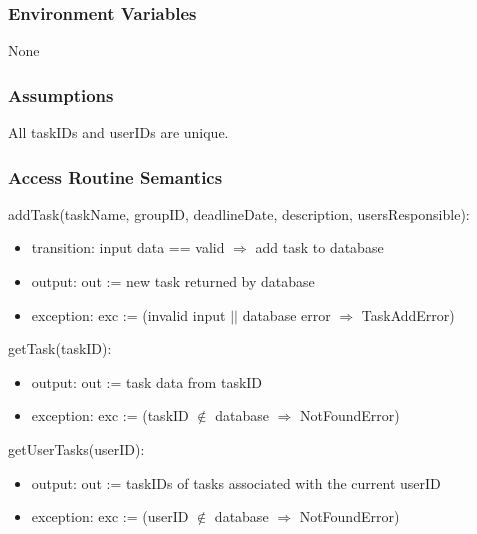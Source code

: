 \documentclass[12pt, titlepage]{article}
\begin{document}
\subsubsection{Environment Variables}

None


\subsubsection{Assumptions}

All taskIDs and userIDs are unique.


\subsubsection{Access Routine Semantics}

\noindent addTask(taskName, groupID, deadlineDate, description, usersResponsible):
\begin{itemize}
\item transition: input data == valid $\Rightarrow$ add task to database
\item output: out := new task returned by database
\item exception:  exc := (invalid input $\vert\vert$ database error $\Rightarrow$ TaskAddError)
\end{itemize}

\noindent getTask(taskID):
\begin{itemize}
\item output: out := task data from taskID
\item exception: exc := (taskID $\notin$ database $\Rightarrow$ NotFoundError)
\end{itemize}

\noindent getUserTasks(userID):
\begin{itemize}
\item output: out := taskIDs of tasks associated with the current userID
\item exception: exc := (userID $\notin$ database $\Rightarrow$ NotFoundError)
\end{itemize}
\end{document}
